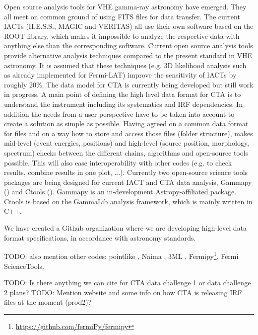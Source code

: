 Open source analysis tools for VHE gamma-ray astronomy have emerged. They all meet on common ground of using FITS files for data transfer. The current IACTs (H.E.S.S., MAGIC and VERITAS) all use their own software based on the ROOT library, which makes it impossible to analyze the respective data with anything else than the corresponding software. Current open source analysis tools provide alternative analysis techniques compared to the present standard in VHE astronomy. It is assumed that these techniques (e.g. 3D likelihood analysis such as already implemented for Fermi-LAT) improve the sensitivity of IACTs by roughly 20\%. The data model for CTA is currently being developed but still work in progress. A main point of defining the high level data format for CTA is to understand the instrument including its systematics and IRF dependencies. In addition the needs from a user perspective have to be taken into account to create a solution as simple as possible. Having agreed on a common data format for files and on a way how to store and access those files (folder structure), makes mid-level (event energies, positions) and high-level (source position, morphology, spectrum) checks between the different chains, algorithms and open-source tools possible. This will also ease interoperability with other codes (e.g. to check results, combine results in one plot, ...). Currently two open-source science tools packages are being designed for current IACT and CTA data analysis, Gammapy (\cite{2015arXiv150907408D}) and Ctools (\cite{2016AnA...593A...1K}). Gammapy is an in-development Astropy-affiliated package. Ctools is based on the GammaLib analysis framework, which is mainly written in C++.

We have created a Github organization where we are developing high-level data format specifications, in accordance with astronomy standards. 

TODO: also mention other codes: pointlike \citep{2010PhDT.......147K},
Naima \citep{2015arXiv150903319Z}, 3ML \citep{2015arXiv150708343V},
Fermipy\footnote{\url{https://github.com/fermiPy/fermipy}}, Fermi ScienceTools.

TODO: Is there anything we can cite for CTA data challenge 1 or data challenge 2 plans?
TODO: Mention website and some info on how CTA is releasing IRF files at the moment (prod2)?
